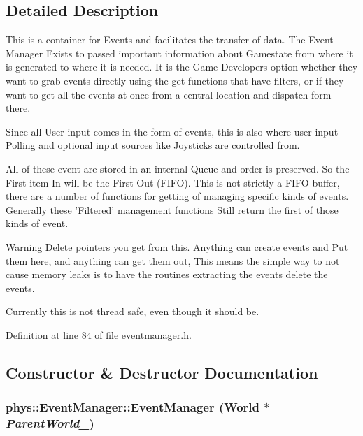 \subsection{Detailed Description}
This is a container for Events and facilitates the transfer of data. The Event Manager Exists to passed important information about Gamestate from where it is generated to where it is needed. It is the Game Developers option whether they want to grab events directly using the get functions that have filters, or if they want to get all the events at once from a central location and dispatch form there. \par
 Since all User input comes in the form of events, this is also where user input Polling and optional input sources like Joysticks are controlled from. \par
 All of these event are stored in an internal Queue and order is preserved. So the First item In will be the First Out (FIFO). This is not strictly a FIFO buffer, there are a number of functions for getting of managing specific kinds of events. Generally these 'Filtered' management functions Still return the first of those kinds of event. \begin{DoxyWarning}{Warning}
Delete pointers you get from this. Anything can create events and Put them here, and anything can get them out, This means the simple way to not cause memory leaks is to have the routines extracting the events delete the events. 

Currently this is not thread safe, even though it should be. 
\end{DoxyWarning}


Definition at line 84 of file eventmanager.h.



\subsection{Constructor \& Destructor Documentation}
\hypertarget{classphys_1_1EventManager_a148f8c559642d3d50206169b3d0406be}{
\subsubsection[{EventManager}]{\setlength{\rightskip}{0pt plus 5cm}phys::EventManager::EventManager ({\bf World} $\ast$ {\em ParentWorld\_\-})}}
\label{da/dde/classphys_1_1EventManager_a148f8c559642d3d50206169b3d0406be}


